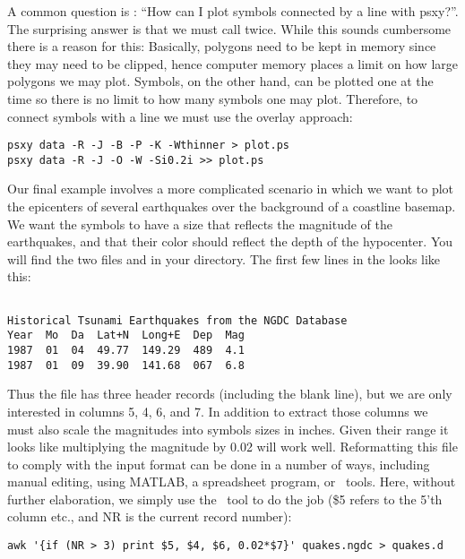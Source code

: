 \documentclass[11pt]{report}
\begin{document}
A common question is : ``How can I plot symbols connected by a line
with psxy?''.  The surprising answer is that we must call  twice.
While this sounds cumbersome there is a reason for this:  Basically,
polygons need to be kept in memory since they may need to be clipped,
hence computer memory places a limit on how large polygons we may plot.
Symbols, on the other hand, can be plotted one at the time so there
is no limit to how many symbols one may plot.  Therefore, to connect
symbols with a line we must use the overlay approach:

{\small\begin{verbatim} 
psxy data -R -J -B -P -K -Wthinner > plot.ps
psxy data -R -J -O -W -Si0.2i >> plot.ps
\end{verbatim}
}

Our final  example involves a more complicated scenario
in which we want to plot the epicenters of several earthquakes over
the background of a coastline basemap.  We want the symbols to have a
size that reflects the magnitude of the earthquakes, and that their
color should reflect the depth of the hypocenter.  You will find the
two files  and  in your
directory.  The first few lines in the  looks
like this:\par 

{\small\begin{verbatim}

Historical Tsunami Earthquakes from the NGDC Database
Year  Mo  Da  Lat+N  Long+E  Dep  Mag
1987  01  04  49.77  149.29  489  4.1
1987  01  09  39.90  141.68  067  6.8
\end{verbatim}
}

Thus the file has three header records (including the blank line),
but we are only interested in columns 5, 4, 6, and 7.  In addition to
extract those columns we must also scale the magnitudes into symbols
sizes in inches.  Given their range it looks like multiplying the
magnitude by 0.02 will work well.  Reformatting this file to comply
with the  input format can be done in a number of ways,
including manual editing, using MATLAB, a spreadsheet program, or \UNIX\
tools.  Here, without further elaboration, we simply use the \UNIX\ tool
\progname{awk} to do the job (\$5 refers to the 5'th column etc., and NR
is the current record number):

{\small\begin{verbatim}
awk '{if (NR > 3) print $5, $4, $6, 0.02*$7}' quakes.ngdc > quakes.d
\end{verbatim}
}
\end{document}
